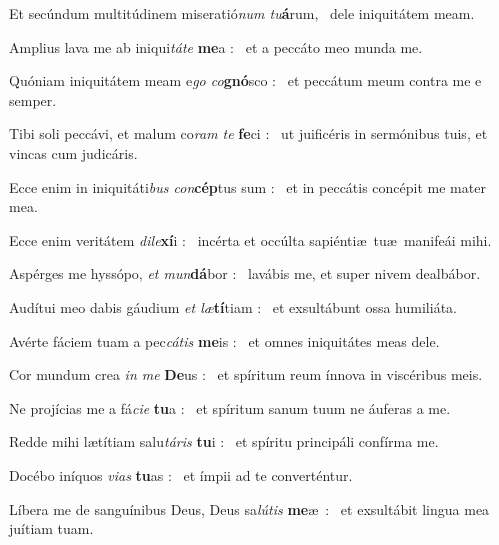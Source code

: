 \documentclass[12pt]{article} %
\newenvironment{psalmtext}{\leftskip 0.25in}{\vspace{2 mm}}
\let\oldgresixstar\gresixstar
\renewcommand{\gresixstar}{\textcolor{benred8}{\oldgresixstar}}
\begin{document}
\begin{psalmtext}

Et sec\'{u}ndum multit\'{u}dinem miserati\'{o}\emph{num tu}\textbf{\'{a}}rum, \gresixstar\ dele iniquit\'{a}tem meam.

Amplius lava me ab iniqui\emph{t\'{a}te} \textbf{me}a : \gresixstar\ et a pecc\'{a}to meo munda me.

Qu\'{o}niam iniquit\'{a}tem meam e\emph{go co}\textbf{gn\'{o}}sco : \gresixstar\ et pecc\'{a}tum meum contra me e semper.

Tibi soli pecc\'{a}vi, et malum co\emph{ram te} \textbf{fe}ci : \gresixstar\ ut juific\'{e}ris in serm\'{o}nibus tuis, et vincas cum judic\'{a}ris.

Ecce enim in iniquit\'{a}ti\emph{bus con}\textbf{c\'{e}p}tus sum : \gresixstar\ et in pecc\'{a}tis conc\'{e}pit me mater mea.

Ecce enim verit\'{a}tem \emph{dile}\textbf{x\'{i}}i : \gresixstar\ inc\'{e}rta et occ\'{u}lta sapi\'{e}nti\ae\  tu\ae\ manife\'{a}i mihi.

Asp\'{e}rges me hyss\'{o}po, \emph{et mun}\textbf{d\'{a}}bor : \gresixstar\ lav\'{a}bis me, et super nivem dealb\'{a}bor.

Aud\'{i}tui meo dabis g\'{a}udium \emph{et l\ae}\textbf{t\'{i}}tiam : \gresixstar\ et exsult\'{a}bunt ossa humili\'{a}ta.

Av\'{e}rte f\'{a}ciem tuam a pec\emph{c\'{a}tis} \textbf{me}is : \gresixstar\ et omnes iniquit\'{a}tes meas dele.

Cor mundum crea \emph{in me} \textbf{De}us : \gresixstar\ et sp\'{i}ritum reum \'{i}nnova in visc\'{e}ribus meis.

Ne proj\'{i}cias me a f\'{a}\emph{cie} \textbf{tu}a : \gresixstar\ et sp\'{i}ritum sanum tuum ne \'{a}uferas a me.

Redde mihi l\ae t\'{i}tiam salu\emph{t\'{a}ris} \textbf{tu}i : \gresixstar\ et sp\'{i}ritu princip\'{a}li conf\'{i}rma me.

Doc\'{e}bo in\'{i}quos \emph{vias} \textbf{tu}as : \gresixstar\ et \'{i}mpii ad te convert\'{e}ntur.

L\'{i}bera me de sangu\'{i}nibus Deus, Deus sa\emph{l\'{u}tis} \textbf{me}\ae\ : \gresixstar\ et exsult\'{a}bit lingua mea ju\'{i}tiam tuam.


\end{psalmtext}
\end{document}
